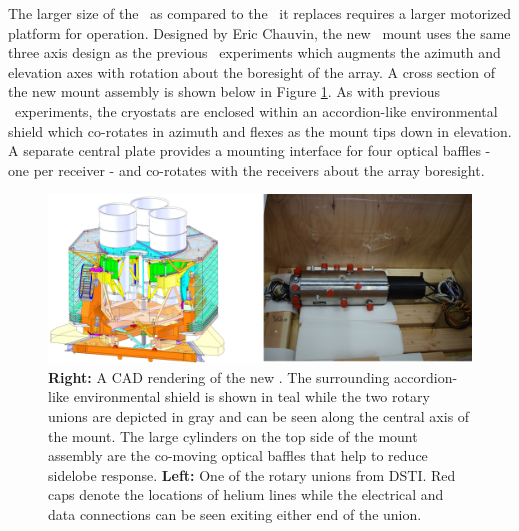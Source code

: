 \documentclass[]{spie}  %
\begin{document}
The larger size of the \biceparray\ as compared to the \keckarray\ it replaces
requires a larger motorized platform for operation. Designed by Eric Chauvin,
the new \biceparray\ mount uses the same three axis design as the previous
\bk\ experiments which augments the azimuth and elevation axes with
rotation about the boresight of the array. A
cross section of the new mount assembly is shown below in Figure
\ref{fig:bamount}. As with previous \bk\ experiments, the cryostats
are enclosed within an accordion-like environmental shield which co-rotates in
azimuth and flexes as the mount tips down in elevation. A separate central
plate provides a mounting interface for four optical baffles - one per
receiver - and co-rotates with the receivers about the array boresight.


\begin{figure} [hb]
	\begin{center}
		\includegraphics[scale=0.65]{mount.png}
	\end{center}
	\caption{\textbf{Right:} A CAD rendering of the new \biceparray. The surrounding
	accordion-like environmental shield is shown in teal while the two rotary
	unions are depicted in gray and can be seen along the central axis of the
	mount. The large cylinders on the top side of the mount assembly are the co-moving optical baffles that help to reduce sidelobe response. \textbf{Left:} One of the rotary unions from DSTI. Red caps
	denote the locations of helium lines while the electrical and data connections
	can be seen exiting either end of the union.}
	\label{fig:bamount}
\end{figure}

\clearpage
\end{document}
